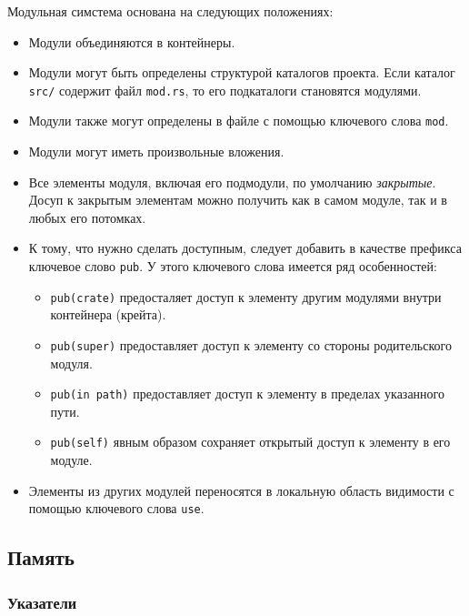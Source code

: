 \documentclass[%
	11pt,
	a4paper,
	utf8,
		]{article}
\begin{document}
Модульная симстема основана на следующих положениях:
\begin{itemize}
	\item Модули объединяются в контейнеры.
	
	\item Модули могут быть определены структурой каталогов проекта. Если каталог \verb|src/| содержит файл \verb|mod.rs|, то его подкаталоги становятся модулями.
	
	\item Модули также могут определены в файле с помощью ключевого слова \verb|mod|.
	
	\item Модули могут иметь произвольные вложения.
	
	\item Все элементы модуля, включая его подмодули, по умолчанию \emph{закрытые}. Досуп к закрытым элементам можно получить как в самом модуле, так и в любых его потомках.
	
	\item К тому, что нужно сделать доступным, следует добавить в качестве префикса ключевое слово \verb|pub|. У этого ключевого слова имеется ряд особенностей:
	\begin{itemize}
		\item \verb|pub(crate)| предосталяет доступ к элементу другим модулями внутри контейнера (крейта).
		
		\item \verb|pub(super)| предоставляет доступ к элементу со стороны родительского модуля.
		
		\item \verb|pub(in path)| предоставляет доступ к элементу в пределах указанного пути.
		
		\item \verb|pub(self)| явным образом сохраняет открытый доступ к элементу в его модуле.
		\end{itemize}
	
	\item Элементы из других модулей переносятся в локальную область видимости с помощью ключевого слова \verb|use|.
\end{itemize}

\subsection{Память}

\subsubsection{Указатели}
\end{document}
